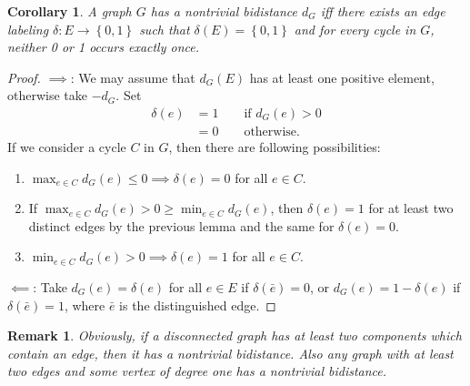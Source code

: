 \documentclass[a4paper, 11pt]{article}
\newtheorem{cor}[thm]{Corollary}
\newtheorem*{rem}{Remark}
\theoremstyle{definition}
\begin{document}
\begin{cor}
\label{cor:binaryLabelling}
A graph $G$ has a nontrivial bidistance $d_G$ iff there exists an edge labeling $\delta:E\rightarrow \left\{0,1\right\}$ such that $\delta(E)=\left\{0,1\right\}$ and for every cycle in $G$, neither 0 or 1 occurs exactly once.
\end{cor}
\begin{proof}
$\implies$: We may assume that $d_G(E)$ has at least one positive element, otherwise take $-d_G$. Set
\begin{align*}
\delta(e)&=1 \qquad \text{if } d_G(e)>0 \\
		&=0 \qquad \text{otherwise.}
\end{align*}
If we consider a cycle $C$ in $G$, then there are following possibilities:
\begin{enumerate}
	\item $\max_{e\in C} d_G(e) \leq 0 \implies \delta(e)=0$ for all $e \in C$.
	\item If $\max_{e\in C} d_G(e) > 0 \geq \min_{e\in C} d_G(e)$, then $\delta(e)=1$ for at least two distinct edges by the previous lemma and the same for $\delta(e)=0$.
	\item $\min_{e\in C} d_G(e) > 0 \implies \delta(e)=1$ for all $e \in C$.
\end{enumerate}
$\impliedby$: Take $d_G(e)=\delta(e)$ for all $e\in E$ if $\delta(\bar{e})=0$, or $d_G(e)=1-\delta(e)$ if $\delta(\bar{e})=1$, where $\bar{e}$ is the distinguished edge.
\end{proof}


\begin{rem}
Obviously, if a disconnected graph has at least two components which contain an edge, then it has a nontrivial bidistance. Also any graph with at least two edges and some vertex of degree one has a nontrivial bidistance.
\end{rem}
\end{document}
